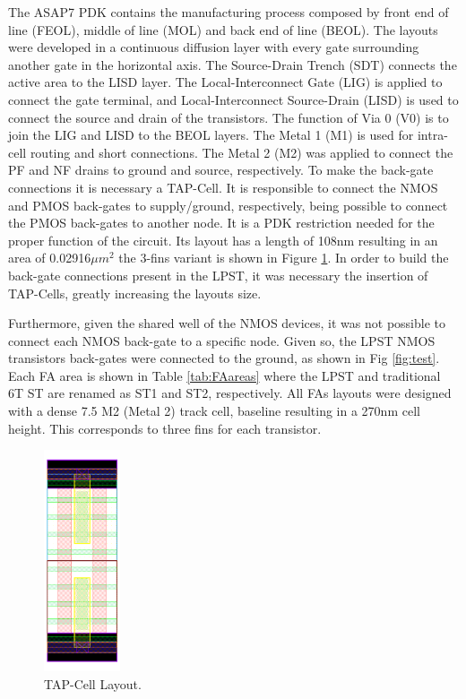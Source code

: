 \documentclass[pgmicro,mestrado,english]{iiufrgs}
\begin{document}
The ASAP7 PDK contains the manufacturing process composed by front end of line (FEOL), middle of line (MOL) and back end of line (BEOL). The layouts were developed in a continuous diffusion layer with every gate surrounding another gate in the horizontal axis. The Source-Drain Trench (SDT) connects the active area to the LISD layer. The Local-Interconnect Gate (LIG) is applied to connect the gate terminal, and Local-Interconnect Source-Drain (LISD) is used to connect the source and drain of the transistors. The function of Via 0 (V0) is to join the LIG and LISD to the BEOL layers. The Metal 1 (M1) is used for intra-cell routing and short connections. The Metal 2 (M2) was applied to connect the PF and NF drains to ground and source, respectively. To make the back-gate connections it is necessary a TAP-Cell. It is responsible to connect the NMOS and PMOS back-gates to supply/ground, respectively, being possible to connect the PMOS back-gates to another node. It is a PDK restriction needed for the proper function of the circuit. Its layout has a length of 108nm resulting in an area of 0.02916${\mu}m^{2}$ the 3-fins variant is shown in Figure \ref{tap}. In order to build the back-gate connections present in the LPST, it was necessary the insertion of TAP-Cells, greatly increasing the layouts size.

Furthermore, given the shared well of the NMOS devices, it was not possible to connect each NMOS back-gate to a specific node. Given so, the LPST NMOS transistors back-gates were connected to the ground, as shown in Fig \ref{fig:test}. Each FA area is shown in Table \ref{tab:FAareas} where the LPST and traditional 6T ST are renamed as ST1 and ST2, respectively. All FAs layouts were designed with a dense 7.5 M2 (Metal 2) track cell, baseline resulting in a 270nm cell height. This corresponds to three fins for each transistor.

\begin{figure}[]
\centering
\includegraphics[width=0.2\textwidth]{TAP.png}
\caption{TAP-Cell Layout.}
\label{tap}
\end{figure}
\end{document}
